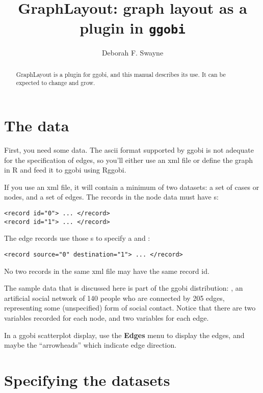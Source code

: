 \documentclass[11pt]{article}
\begin{document}
\title{GraphLayout: graph layout as a plugin in {\tt ggobi}}
\author{Deborah F. Swayne}
\maketitle

\begin{abstract}
GraphLayout is a plugin for ggobi, and this manual
describes its use.  It can be expected to change and grow.
\end{abstract}

\section{The data}

First, you need some data.  The ascii format supported by ggobi is not
adequate for the specification of edges, so you'll either use an xml
file or define the graph in R and feed it to ggobi using Rggobi.

If you use an xml file, it will contain a minimum of two datasets: a
set of cases or nodes, and a set of edges.  The records in the node
data must have s:

\begin{verbatim}
<record id="0"> ... </record>
<record id="1"> ... </record>
\end{verbatim}

The edge records use those s to specify a
 and :

\begin{verbatim}
<record source="0" destination="1"> ... </record>
\end{verbatim}

No two records in the same xml file may have the same record id.

The sample data that is discussed here is part of the ggobi distribution:
, an artificial social network of 140 people who are
connected by 205 edges, representing some (unspecified) form of social
contact.  Notice that there are two variables recorded for each node,
and two variables for each edge.

In a ggobi scatterplot display, use the {\bf Edges} menu to
display the edges, and maybe the ``arrowheads'' which indicate
edge direction.

\section{Specifying the datasets}
\end{document}
